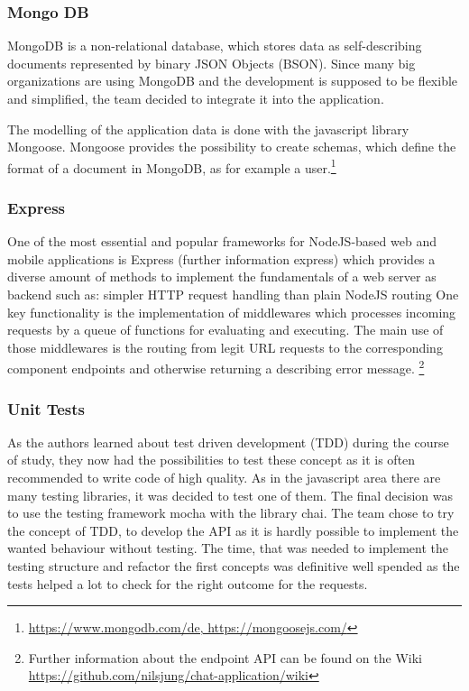 \subsubsection{Mongo DB}
MongoDB is a non-relational database, which stores data as self-describing documents represented by binary JSON Objects (BSON). 
Since many big organizations are using MongoDB and the development is supposed to be flexible and simplified, the team decided to integrate it into the application.

The modelling of the application data is done with the javascript library Mongoose.
Mongoose provides the possibility to create schemas, which define the format of a document in MongoDB, as for example a user.\footnote{\url{https://www.mongodb.com/de, https://mongoosejs.com/}}

\subsubsection{Express}
One of the most essential and popular frameworks for NodeJS-based web and mobile applications is Express (further information express) which provides a diverse amount of methods to implement the fundamentals of a web server as backend such as:
simpler HTTP request handling than plain NodeJS
routing
One key functionality is the implementation of middlewares which processes incoming requests by a queue of functions for evaluating and executing. The main use of those middlewares is the routing from legit URL requests to the corresponding component endpoints and otherwise returning a describing error message.
\footnote{Further information about the endpoint API can be found on the Wiki \url{https://github.com/nilsjung/chat-application/wiki}}
\subsubsection{Unit Tests}
As the authors learned about test driven development (TDD) during the course of study, they now had the possibilities to test these concept as it is often recommended to write code of high quality. As in the javascript area there are many testing libraries, it was decided to test one of them. The final decision was to use the testing framework mocha with the library chai.
The team chose to try the concept of TDD, to develop the API as it is hardly possible to implement the wanted behaviour without testing. The time, that was needed to implement the testing structure and refactor the first concepts was definitive well spended as the tests helped a lot to check for the right outcome for the requests.

